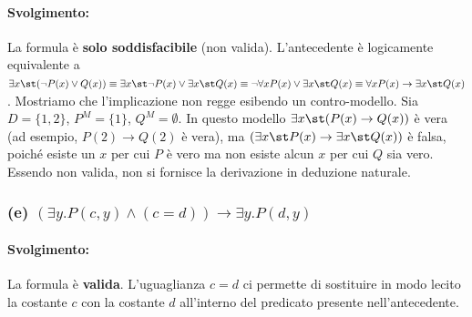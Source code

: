 \paragraph{Svolgimento:}
La formula è \textbf{solo soddisfacibile} (non valida). 
L'antecedente è logicamente equivalente a \(\exists x\st (\neg P(x)\vee Q(x)) \equiv \exists x\st \neg P(x) \vee \exists x\st Q(x) \equiv \neg\forall x P(x) \vee \exists x\st Q(x) \equiv \forall x P(x) \rightarrow \exists x\st Q(x)\).
Mostriamo che l'implicazione non regge esibendo un contro-modello. Sia \(D=\{1,2\}\), \(P^M=\{1\}\), \(Q^M=\emptyset\).
In questo modello \(\exists x\st (P(x)\rightarrow Q(x))\) è vera (ad esempio, \(P(2)\to Q(2)\) è vera), ma \((\exists x\st P(x)\rightarrow\exists x\st Q(x))\) è falsa, poiché esiste un \(x\) per cui \(P\) è vero ma non esiste alcun \(x\) per cui \(Q\) sia vero.
Essendo non valida, non si fornisce la derivazione in deduzione naturale.

\subsubsection*{(e) \((\exists y.P(c,y)\wedge(c=d))\rightarrow\exists y.P(d,y)\)}

\paragraph{Svolgimento:}
La formula è \textbf{valida}. L'uguaglianza \(c=d\) ci permette di sostituire in modo lecito la costante \(c\) con la costante \(d\) all'interno del predicato presente nell'antecedente.

\begin{prooftree}
  \small
  
  
  
\end{prooftree}